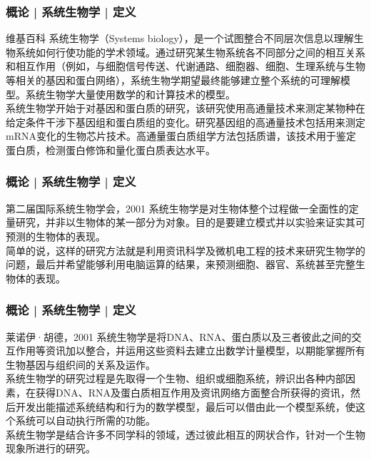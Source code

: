 \begin{frame}[label=current]
  \frametitle{概论 | 系统生物学 | 定义}
  \begin{block}{维基百科}
系统生物学（Systems biology），是一个试图整合不同层次信息以理解生物系统如何行使功能的学术领域。通过研究某生物系统各不同部分之间的相互关系和相互作用（例如，与细胞信号传送、代谢通路、细胞器、细胞、生理系统与生物等相关的基因和蛋白网络），系统生物学期望最终能够建立整个系统的可理解模型。系统生物学大量使用数学的和计算技术的模型。\\
\vspace{1em}
系统生物学开始于对基因和蛋白质的研究，该研究使用高通量技术来测定某物种在给定条件干涉下基因组和蛋白质组的变化。研究基因组的高通量技术包括用来测定mRNA变化的生物芯片技术。高通量蛋白质组学方法包括质谱，该技术用于鉴定蛋白质，检测蛋白修饰和量化蛋白质表达水平。
  \end{block}
\end{frame}

\begin{frame}[label=current]
  \frametitle{概论 | 系统生物学 | 定义}
  \begin{block}{第二届国际系统生物学会，2001}
系统生物学是对生物体整个过程做一全面性的定量研究，并非以生物体的某一部分为对象。目的是要建立模式并以实验来证实其可预测的生物体的表现。\\
\vspace{1em}
简单的说，这样的研究方法就是利用资讯科学及微机电工程的技术来研究生物学的问题，最后并希望能够利用电脑运算的结果，来预测细胞、器官、系统甚至完整生物体的表现。
  \end{block}
\end{frame}

\begin{frame}[label=current]
  \frametitle{概论 | 系统生物学 | 定义}
  \begin{block}{莱诺伊·胡德，2001}
系统生物学是将DNA、RNA、蛋白质以及三者彼此之间的交互作用等资讯加以整合，并运用这些资料去建立出数学计量模型，以期能掌握所有生物基因与组织间的关系及运作。\\
\vspace{1em}
系统生物学的研究过程是先取得一个生物、组织或细胞系统，辨识出各种内部因素，在获得DNA、RNA及蛋白质相互作用及资讯网络方面整合所获得的资讯，然后开发出能描述系统结构和行为的数学模型，最后可以借由此一个模型系统，使这个系统可以自动执行所需的功能。\\
\vspace{1em}
系统生物学是结合许多不同学科的领域，透过彼此相互的网状合作，针对一个生物现象所进行的研究。
  \end{block}
\end{frame}

